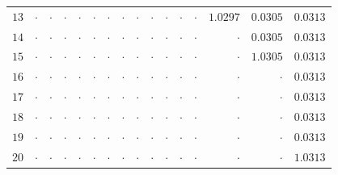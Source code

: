 \begin{table}[H]
{\begin{tabular}{r|rrrrrrrrrrrrrrr}
$13$ & $\cdot$ & $\cdot$ & $\cdot$ & $\cdot$ & $\cdot$ & $\cdot$ & $\cdot$ & $\cdot$ & $\cdot$ & $\cdot$ & $\cdot$ & $\cdot$ & \cellcolor{orange!35}$\mathbf{1.0297}$ & \cellcolor{cyan!18}$0.0305$ & \cellcolor{cyan!18}$0.0313$ \\
$14$ & $\cdot$ & $\cdot$ & $\cdot$ & $\cdot$ & $\cdot$ & $\cdot$ & $\cdot$ & $\cdot$ & $\cdot$ & $\cdot$ & $\cdot$ & $\cdot$ & $\cdot$ & \cellcolor{cyan!18}$0.0305$ & \cellcolor{cyan!18}$0.0313$ \\
$15$ & $\cdot$ & $\cdot$ & $\cdot$ & $\cdot$ & $\cdot$ & $\cdot$ & $\cdot$ & $\cdot$ & $\cdot$ & $\cdot$ & $\cdot$ & $\cdot$ & $\cdot$ & \cellcolor{orange!35}$\mathbf{1.0305}$ & \cellcolor{cyan!18}$0.0313$ \\
$16$ & $\cdot$ & $\cdot$ & $\cdot$ & $\cdot$ & $\cdot$ & $\cdot$ & $\cdot$ & $\cdot$ & $\cdot$ & $\cdot$ & $\cdot$ & $\cdot$ & $\cdot$ & $\cdot$ & \cellcolor{cyan!18}$0.0313$ \\
$17$ & $\cdot$ & $\cdot$ & $\cdot$ & $\cdot$ & $\cdot$ & $\cdot$ & $\cdot$ & $\cdot$ & $\cdot$ & $\cdot$ & $\cdot$ & $\cdot$ & $\cdot$ & $\cdot$ & \cellcolor{cyan!18}$0.0313$ \\
$18$ & $\cdot$ & $\cdot$ & $\cdot$ & $\cdot$ & $\cdot$ & $\cdot$ & $\cdot$ & $\cdot$ & $\cdot$ & $\cdot$ & $\cdot$ & $\cdot$ & $\cdot$ & $\cdot$ & \cellcolor{cyan!18}$0.0313$ \\
$19$ & $\cdot$ & $\cdot$ & $\cdot$ & $\cdot$ & $\cdot$ & $\cdot$ & $\cdot$ & $\cdot$ & $\cdot$ & $\cdot$ & $\cdot$ & $\cdot$ & $\cdot$ & $\cdot$ & \cellcolor{cyan!18}$0.0313$ \\
$20$ & $\cdot$ & $\cdot$ & $\cdot$ & $\cdot$ & $\cdot$ & $\cdot$ & $\cdot$ & $\cdot$ & $\cdot$ & $\cdot$ & $\cdot$ & $\cdot$ & $\cdot$ & $\cdot$ & \cellcolor{orange!35}$\mathbf{1.0313}$ \\
\bottomrule
\end{tabular}}
\end{table}
